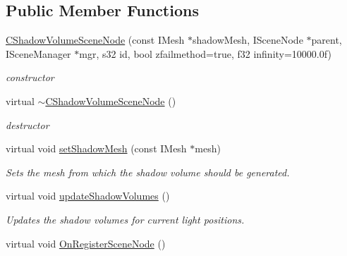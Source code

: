 \subsection*{Public Member Functions}
\begin{DoxyCompactItemize}
\item 
\hypertarget{classirr_1_1scene_1_1_c_shadow_volume_scene_node_adc42969b78551b5ff5133bcac5c77b5f}{\hyperlink{classirr_1_1scene_1_1_c_shadow_volume_scene_node_adc42969b78551b5ff5133bcac5c77b5f}{C\-Shadow\-Volume\-Scene\-Node} (const I\-Mesh $\ast$shadow\-Mesh, I\-Scene\-Node $\ast$parent, I\-Scene\-Manager $\ast$mgr, s32 id, bool zfailmethod=true, f32 infinity=10000.\-0f)}\label{classirr_1_1scene_1_1_c_shadow_volume_scene_node_adc42969b78551b5ff5133bcac5c77b5f}

\begin{DoxyCompactList}\small\item\em constructor \end{DoxyCompactList}\item 
\hypertarget{classirr_1_1scene_1_1_c_shadow_volume_scene_node_aae84a60cb5cef8b620a89950c7d164ba}{virtual \hyperlink{classirr_1_1scene_1_1_c_shadow_volume_scene_node_aae84a60cb5cef8b620a89950c7d164ba}{$\sim$\-C\-Shadow\-Volume\-Scene\-Node} ()}\label{classirr_1_1scene_1_1_c_shadow_volume_scene_node_aae84a60cb5cef8b620a89950c7d164ba}

\begin{DoxyCompactList}\small\item\em destructor \end{DoxyCompactList}\item 
virtual void \hyperlink{classirr_1_1scene_1_1_c_shadow_volume_scene_node_a2c3f5dffc57c18c9ff4d0a9f5f971abd}{set\-Shadow\-Mesh} (const I\-Mesh $\ast$mesh)
\begin{DoxyCompactList}\small\item\em Sets the mesh from which the shadow volume should be generated. \end{DoxyCompactList}\item 
virtual void \hyperlink{classirr_1_1scene_1_1_c_shadow_volume_scene_node_abb040483a3f02cb51ca38adf37d51df9}{update\-Shadow\-Volumes} ()
\begin{DoxyCompactList}\small\item\em Updates the shadow volumes for current light positions. \end{DoxyCompactList}\item 
\hypertarget{classirr_1_1scene_1_1_c_shadow_volume_scene_node_a13445e4f508b148ee30aab9191fafce1}{virtual void \hyperlink{classirr_1_1scene_1_1_c_shadow_volume_scene_node_a13445e4f508b148ee30aab9191fafce1}{On\-Register\-Scene\-Node} ()}\label{classirr_1_1scene_1_1_c_shadow_volume_scene_node_a13445e4f508b148ee30aab9191fafce1}


\end{DoxyCompactItemize}
